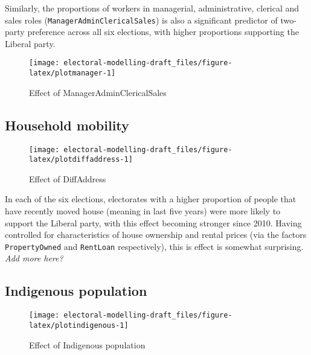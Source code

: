 \documentclass[openany]{book}
\begin{document}
Similarly, the proportions of workers in managerial, administrative, clerical and sales roles (\texttt{ManagerAdminClericalSales}) is also a significant predictor of two-party preference across all six elections, with higher proportions supporting the Liberal party.

\begin{figure}[h]

{\centering \texttt{[image: electoral-modelling-draft\_files/figure-latex/plotmanager-1]} 

}

\caption{Effect of ManagerAdminClericalSales}\label{fig:plotmanager}
\end{figure}

\hypertarget{household-mobility}{%
\subsection{Household mobility}\label{household-mobility}}

\begin{figure}[h]

{\centering \texttt{[image: electoral-modelling-draft\_files/figure-latex/plotdiffaddress-1]} 

}

\caption{Effect of DiffAddress}\label{fig:plotdiffaddress}
\end{figure}

In each of the six elections, electorates with a higher proportion of people that have recently moved house (meaning in last five years) were more likely to support the Liberal party, with this effect becoming stronger since 2010. Having controlled for characteristics of house ownership and rental prices (via the factors \texttt{PropertyOwned} and \texttt{RentLoan} respectively), this is effect is somewhat surprising. \emph{Add more here?}

\hypertarget{indigenous-population}{%
\subsection{Indigenous population}\label{indigenous-population}}

\begin{figure}[h]

{\centering \texttt{[image: electoral-modelling-draft\_files/figure-latex/plotindigenous-1]} 

}

\caption{Effect of Indigenous population}\label{fig:plotindigenous}
\end{figure}
\end{document}
